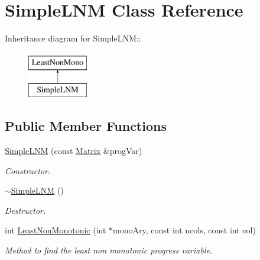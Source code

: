 \hypertarget{classSimpleLNM}{
\section{SimpleLNM Class Reference}
\label{d8/dfe/classSimpleLNM}
}
Inheritance diagram for SimpleLNM::\begin{figure}[H]
\begin{center}
\leavevmode
\includegraphics[height=2cm]{d8/dfe/classSimpleLNM}
\end{center}
\end{figure}
\subsection*{Public Member Functions}
\begin{DoxyCompactItemize}
\item 
\hyperlink{classSimpleLNM_a45bd676f6bb504baf1b46ddcbf2f8fb8}{SimpleLNM} (const \hyperlink{classMatrix}{Matrix} \&progVar)
\begin{DoxyCompactList}\small\item\em Constructor. \item\end{DoxyCompactList}\item 
\hypertarget{classSimpleLNM_a89cbe5270c4846ebba8ab1660149112f}{
\hyperlink{classSimpleLNM_a89cbe5270c4846ebba8ab1660149112f}{$\sim$SimpleLNM} ()}
\label{d8/dfe/classSimpleLNM_a89cbe5270c4846ebba8ab1660149112f}

\begin{DoxyCompactList}\small\item\em Destructor. \item\end{DoxyCompactList}\item 
int \hyperlink{classSimpleLNM_a9d296839ca84467c0f6241b1393bd6d5}{LeastNonMonotonic} (int $\ast$monoAry, const int ncols, const int col)
\begin{DoxyCompactList}\small\item\em Method to find the least non monotonic progress variable. \item\end{DoxyCompactList}\end{DoxyCompactItemize}



